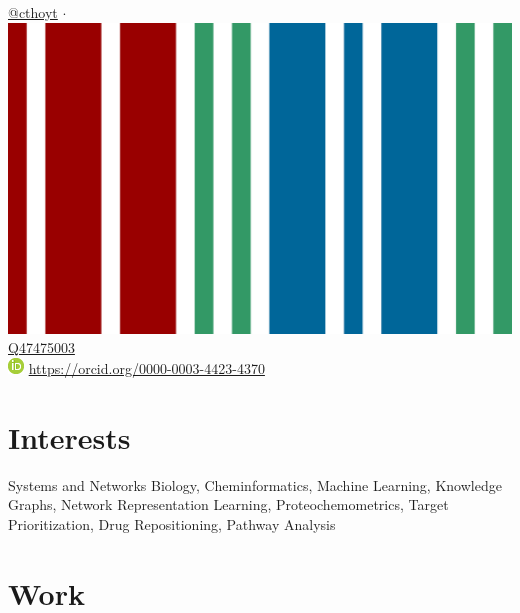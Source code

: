 \documentclass[11pt,a4paper,sans]{moderncv} %
\begin{document}
\href{https://twitter.com/cthoyt}{@cthoyt}
$\cdot$
\includegraphics[scale=0.01]{img/wikidata_logo.png}
\href{https://www.wikidata.org/wiki/Q47475003}{Q47475003}
\\
\includegraphics[scale=0.5]{img/ORCIDiD_icon16x16.png}
\href{https://orcid.org/0000-0003-4423-4370}{https://orcid.org/0000-0003-4423-4370}


\section{Interests}\label{sec:interests}

Systems and Networks Biology, Cheminformatics, Machine Learning, Knowledge Graphs, Network Representation Learning, Proteochemometrics, Target Prioritization, Drug Repositioning, Pathway Analysis


\section{Work}\label{sec:work}





\end{document}
